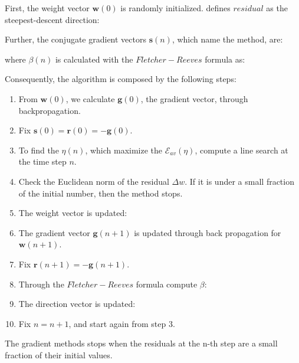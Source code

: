 First, the weight vector $\mathbf{w}(0)$ is randomly initialized. 
\citet {RefWorks:158} defines $residual$ as the steepest-descent
direction:

Further, the conjugate gradient vectors $\mathbf{s}(n)$, which name the method,
are:

where $\beta(n)$ is calculated with the $Fletcher-Reeves$ formula as:

Consequently, the algorithm is composed by the following steps:
\begin{enumerate}
  \item{From $\mathbf{w}(0)$, we calculate $\mathbf{g}(0)$, the gradient
  vector, through backpropagation.}
  \item{Fix $\mathbf{s}(0) = \mathbf{r}(0) = - \mathbf{g}(0)$.}
  \item{To find the $\eta(n)$, which maximize the $\mathscr{E}_{av}(\eta)$,
  compute a line search at the time step $n$.}
  \item{Check the Euclidean norm of the residual $\Delta w$. If it is
  under a small fraction of the initial number, then the method stops.}
  \item{The weight vector is updated:
  
  } 
  \item{The gradient vector $\mathbf{g}(n + 1)$ is updated through back
  propagation for $\mathbf{w}(n + 1)$.}
  \item{Fix $\mathbf{r}(n + 1) = - \mathbf{g}(n + 1)$.}
  \item{Through the $Fletcher-Reeves$ formula compute $\beta$:
  
  }
  \item{The direction vector is updated:
  
  }
  \item{Fix $ n = n + 1$, and start again from step 3.}   
\end{enumerate}
% 
% 
The gradient methods stops when the residuals at the n-th step are a small
fraction of their initial values.



